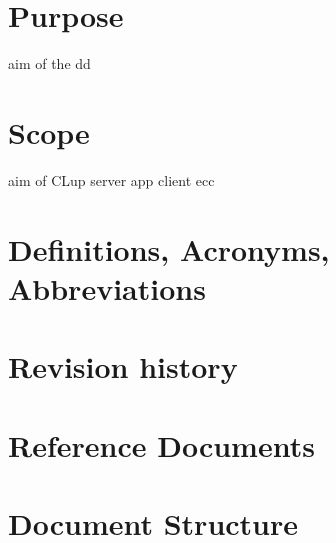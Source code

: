 \section{Purpose}
aim of the dd
\section{Scope}
aim of CLup server app client ecc
\section{Definitions, Acronyms, Abbreviations}
\section{Revision history}
\section{Reference Documents}
\section{Document Structure}
